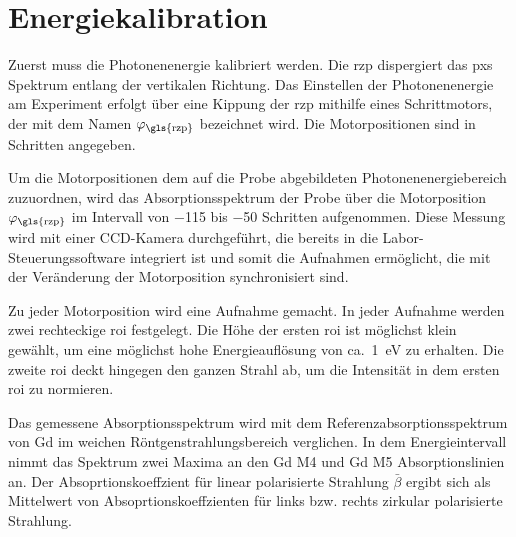 \section{Energiekalibration}
Zuerst muss die Photonenenergie kalibriert werden. Die \gls{rzp} dispergiert das \gls{pxs} Spektrum entlang der vertikalen Richtung. Das Einstellen der Photonenenergie am Experiment erfolgt über eine Kippung der \gls{rzp} mithilfe eines Schrittmotors, der mit dem Namen $\varphi_\text{\gls{rzp}}$ bezeichnet wird. Die Motorpositionen sind in Schritten angegeben.

\noindent
Um die Motorpositionen dem auf die Probe abgebildeten Photonenenergiebereich zuzuordnen, wird das Absorptionsspektrum der Probe über die Motorposition $\varphi_\text{\gls{rzp}}$ im Intervall von \num{-115} bis \num{-50} Schritten aufgenommen. Diese Messung wird mit einer CCD-Kamera durchgeführt, die bereits in die Labor-Steuerungssoftware integriert ist und somit die Aufnahmen ermöglicht, die mit der Veränderung der Motorposition synchronisiert sind.

\noindent
Zu jeder Motorposition wird eine Aufnahme gemacht. In jeder Aufnahme werden zwei rechteckige \gls{roi} festgelegt. Die Höhe der ersten \gls{roi} ist möglichst klein gewählt, um eine möglichst hohe Energieauflösung von ca.\ \SI{1}{\eV} zu erhalten. Die zweite \gls{roi} deckt hingegen den ganzen Strahl ab, um die Intensität in dem ersten \gls{roi} zu normieren. 

\noindent
Das gemessene Absorptionsspektrum wird mit dem Referenzabsorptionsspektrum von Gd im weichen Röntgenstrahlungsbereich \cite[Abb. 2]{prieto-x-ray-2005} verglichen. In dem Energieintervall nimmt das Spektrum zwei Maxima an den Gd M4 und Gd M5 Absorptionslinien an. Der Absoprtionskoeffzient für linear polarisierte Strahlung $\bar{\beta}$ ergibt sich als Mittelwert von Absoprtionskoeffzienten für links bzw. rechts zirkular polarisierte Strahlung.

